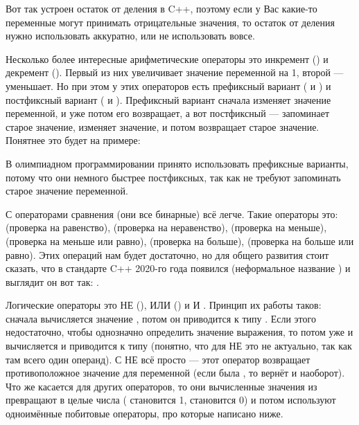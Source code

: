 \begin{itemize}
{    Вот так устроен остаток от деления в C++, поэтому если у Вас какие-то переменные могут принимать отрицательные значения, то остаток от деления нужно использовать аккуратно, или не использовать вовсе.
    
    \item Несколько более интересные арифметические операторы это инкремент (\lcpp{++}) и декремент (\lcpp{--}). Первый из них увеличивает значение переменной на 1, второй — уменьшает. Но при этом у этих операторов есть префиксный вариант ( и ) и постфиксный вариант ( и ). Префиксный вариант сначала изменяет значение переменной, и уже потом его возвращает, а вот постфиксный — запоминает старое значение, изменяет значение, и потом возвращает старое значение. Понятнее это будет на примере:
    
    
    В олимпиадном программировании принято использовать префиксные варианты, потому что они немного быстрее постфиксных, так как не требуют запоминать старое значение переменной.
    
    \item С операторами сравнения (они все бинарные) всё легче. Такие операторы это:  (проверка на равенство),  (проверка на неравенство),  (проверка на меньше),  (проверка на меньше или равно),  (проверка на больше),  (проверка на больше или равно). Этих операций нам будет достаточно, но для общего развития стоит сказать, что в стандарте C++ 2020-го года появился  (неформальное название ) и выглядит он вот так: .
    
    \item Логические операторы это НЕ (), ИЛИ () и И . Принцип их работы таков: сначала вычисляется значение , потом он приводится к типу . Если этого недостаточно, чтобы однозначно определить значение выражения, то потом уже и  вычисляется и приводится к типу  (понятно, что для НЕ это не актуально, так как там всего один операнд). С НЕ всё просто — этот оператор возвращает противоположное значение для переменной (если была , то вернёт  и наоборот). Что же касается для других операторов, то они вычисленные значения из  превращают в целые числа ( становится 1,  становится 0) и потом используют одноимённые побитовые операторы, про которые написано ниже.
    
}
\end{itemize}
